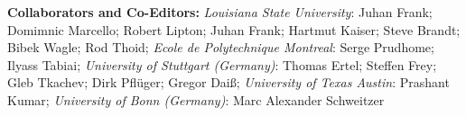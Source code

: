\documentclass[svgnames,11pt]{article}
\begin{document}
\begin{bibsection}

    \item \textbf{Collaborators and Co-Editors:}
        \emph{Louisiana State University}:
            Juhan Frank;
            Domimnic Marcello;
            Robert Lipton;
            Juhan Frank;
            Hartmut Kaiser;
            Steve Brandt;
            Bibek Wagle;
            Rod Thoid;
        \emph{Ecole de Polytechnique Montreal}:
            Serge Prudhome;
            Ilyass Tabiai;
        \emph{University of Stuttgart (Germany)}:
            Thomas Ertel;
            Steffen Frey;
            Gleb Tkachev;
            Dirk Pfl\"uger;
            Gregor Dai\ss;
        \emph{University of Texas Austin}:
            Prashant Kumar;
        \emph{University of Bonn (Germany)}:
            Marc Alexander Schweitzer




\end{bibsection}
\end{document}
